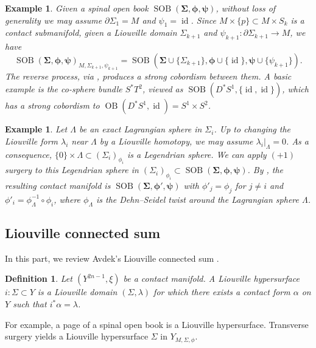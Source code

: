 \documentclass[11pt]{amsart}
\numberwithin{equation}{section}
\newtheorem{definition}[theorem]{\textbf{Definition}}
\newtheorem{example}[theorem]{\textbf{Example}}
\DeclareMathOperator{\Id}{id}
\DeclareMathOperator{\OB}{OB}
\DeclareMathOperator{\SOB}{SOB}
\begin{document}
\begin{example}\label{ex:SOB_Liouville_sum}
    Given a spinal open book $\SOB\left(\bm{\Sigma}, \bm{\phi},\bm{\psi}\right)$, without loss of generality we may assume $\partial \Sigma_1=M$ and $\psi_1=\Id$. Since $M\times \{p\}\subset M\times S_k$ is a contact submanifold, given a Liouville domain $\Sigma_{k+1}$ and $\psi_{k+1}:\partial \Sigma_{k+1}\to M$, we have 
    $$\SOB\left(\bm{\Sigma}, \bm{\phi},\bm{\psi}\right)_{M,\Sigma_{k+1},\psi_{k+1}}=\SOB\left(\bm{\Sigma}\cup \{\Sigma_{k+1}\}, \bm{\phi}\cup \{\Id\},\bm{\psi}\cup \{\psi_{k+1}\}\right).$$
    The reverse process, via , produces a strong cobordism between them. A basic example is the co-sphere bundle $S^*T^2$, viewed as $\SOB(D^*S^1,\{\Id,\Id\})$, which has a strong cobordism to $\OB(D^*S^1,\Id)=S^1\times S^2$.
\end{example}

\begin{example}\label{ex:+1}
Let $\Lambda$ be an exact Lagrangian sphere in $\Sigma_i$. Up to changing the Liouville form $\lambda_i$ near $\Lambda$ by a Liouville homotopy, we may assume $\lambda_i|_{\Lambda}=0$. As a consequence, $\{0\}\times \Lambda \subset (\Sigma_i)_{\phi_i}$ is a Legendrian sphere. We can apply $(+1)$ surgery to this Legendrian sphere in $(\Sigma_i)_{\phi_i}\subset\SOB\left(\bm{\Sigma}, \bm{\phi},\bm{\psi}\right)$. By \cite[Theorem 4.6]{zbMATH06826753}, the resulting contact manifold is $\SOB\left(\bm{\Sigma}, \bm{\phi'},\bm{\psi}\right)$ with $\phi'_j=\phi_j$ for $j\ne i$ and $\phi'_i=\phi^{-1}_{\Lambda}\circ \phi_i$, where $\phi_{\Lambda}$ is the Dehn--Seidel twist around the Lagrangian sphere $\Lambda$.
\end{example}


\subsection{Liouville connected sum}
In this part, we review Avdek's Liouville connected sum \cite{Russell}. 
\begin{definition}
    Let $(Y^{2n-1},\xi)$ be a contact manifold. A Liouville hypersurface $i:\Sigma \subset Y$ is a Liouville domain $(\Sigma,\lambda)$ for which there exists a contact form $\alpha$ on $Y$ such that $i^*\alpha = \lambda$.
\end{definition}
For example, a page of a spinal open book is a Liouville hypersurface. Transverse surgery yields a Liouville hypersurface $\Sigma$ in $Y_{M,\Sigma,\phi}$. 
\end{document}
